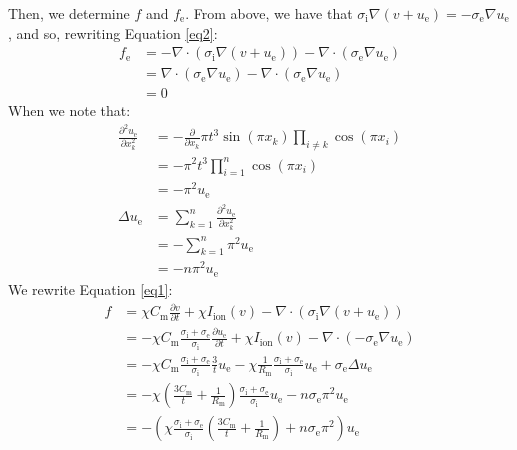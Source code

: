 \documentclass{article}
\begin{document}
Then, we determine $f$ and $f_\text{e}$.
From above, we have that $\sigma_\text{i} \nabla (v + u_\text{e}) = -\sigma_\text{e} \nabla u_\text{e}$,
and so, rewriting Equation \ref{eq2}:
\begin{align*}
    f_\text{e} & = 
            - \nabla \cdot (\sigma_\text{i} \nabla (v + u_\text{e})) 
            - \nabla \cdot (\sigma_\text{e} \nabla u_\text{e}) \\
        & = \nabla \cdot (\sigma_\text{e} \nabla u_\text{e})
            - \nabla \cdot (\sigma_\text{e} \nabla u_\text{e}) \\
        & = 0
\end{align*}
\noindent When we note that:
\begin{align*}
    \frac{\partial^2 u_\text{e}}{\partial x_k^2} & =
            - \frac{\partial}{\partial x_k} \pi t^3 \sin(\pi x_k) \prod_{i \neq k} \cos(\pi x_i) \\
        & = - \pi^2 t^3 \prod_{i = 1}^n \cos(\pi x_i) \\
        & = - \pi^2 u_\text{e} \\
    \Delta u_\text{e} & =
            \sum_{k = 1}^n \frac{\partial^2 u_\text{e}}{\partial x_k^2} \\
        & = - \sum_{k = 1}^n \pi^2 u_\text{e} \\
        & = - n \pi^2 u_\text{e}
\end{align*}
\noindent We rewrite Equation \ref{eq1}:
\begin{align*}
    f & = \chi C_\text{m} \frac{\partial v}{\partial t}
            + \chi I_\text{ion}(v)
            - \nabla \cdot (\sigma_\text{i} \nabla (v + u_\text{e})) \\
        & = - \chi C_\text{m} \frac{\sigma_\text{i} + \sigma_\text{e}}{\sigma_\text{i}} \frac{\partial u_\text{e}}{\partial t}
            + \chi I_\text{ion}(v)
            - \nabla \cdot (-\sigma_\text{e} \nabla u_\text{e}) \\
        & = - \chi C_\text{m} \frac{\sigma_\text{i} + \sigma_\text{e}}{\sigma_\text{i}} \frac{3}{t} u_\text{e}
            - \chi \frac{1}{R_\text{m}} \frac{\sigma_\text{i} + \sigma_\text{e}}{\sigma_\text{i}} u_\text{e}
            + \sigma_\text{e} \Delta u_\text{e} \\
        & = - \chi (\frac{3 C_\text{m}}{t} + \frac{1}{R_\text{m}}) \frac{\sigma_\text{i} + \sigma_\text{e}}{\sigma_\text{i}} u_\text{e}
            - n \sigma_\text{e} \pi^2 u_\text{e} \\
        & = - (\chi \frac{\sigma_\text{i} + \sigma_\text{e}}{\sigma_\text{i}} (\frac{3 C_\text{m}}{t} + \frac{1}{R_\text{m}})
            + n \sigma_\text{e} \pi^2) u_\text{e}
\end{align*}
\end{document}
